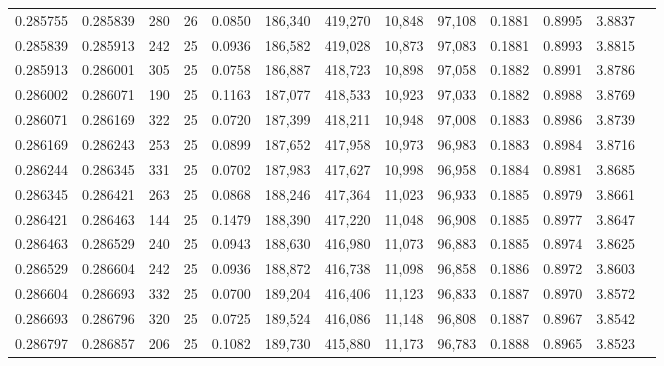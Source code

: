 \begin{tabular}{rrrrrrrrrrrrr}
0.285755 & 0.285839 &   280 &  26 &                                     0.0850 & 186,340 & 419,270 &  10,848 &  97,108 & 0.1881 & 0.8995 & 3.8837 \\
0.285839 & 0.285913 &   242 &  25 &                                     0.0936 & 186,582 & 419,028 &  10,873 &  97,083 & 0.1881 & 0.8993 & 3.8815 \\
0.285913 & 0.286001 &   305 &  25 &                                     0.0758 & 186,887 & 418,723 &  10,898 &  97,058 & 0.1882 & 0.8991 & 3.8786 \\
0.286002 & 0.286071 &   190 &  25 &                                     0.1163 & 187,077 & 418,533 &  10,923 &  97,033 & 0.1882 & 0.8988 & 3.8769 \\
0.286071 & 0.286169 &   322 &  25 &                                     0.0720 & 187,399 & 418,211 &  10,948 &  97,008 & 0.1883 & 0.8986 & 3.8739 \\
0.286169 & 0.286243 &   253 &  25 &                                     0.0899 & 187,652 & 417,958 &  10,973 &  96,983 & 0.1883 & 0.8984 & 3.8716 \\
0.286244 & 0.286345 &   331 &  25 &                                     0.0702 & 187,983 & 417,627 &  10,998 &  96,958 & 0.1884 & 0.8981 & 3.8685 \\
0.286345 & 0.286421 &   263 &  25 &                                     0.0868 & 188,246 & 417,364 &  11,023 &  96,933 & 0.1885 & 0.8979 & 3.8661 \\
0.286421 & 0.286463 &   144 &  25 &                                     0.1479 & 188,390 & 417,220 &  11,048 &  96,908 & 0.1885 & 0.8977 & 3.8647 \\
0.286463 & 0.286529 &   240 &  25 &                                     0.0943 & 188,630 & 416,980 &  11,073 &  96,883 & 0.1885 & 0.8974 & 3.8625 \\
0.286529 & 0.286604 &   242 &  25 &                                     0.0936 & 188,872 & 416,738 &  11,098 &  96,858 & 0.1886 & 0.8972 & 3.8603 \\
0.286604 & 0.286693 &   332 &  25 &                                     0.0700 & 189,204 & 416,406 &  11,123 &  96,833 & 0.1887 & 0.8970 & 3.8572 \\
0.286693 & 0.286796 &   320 &  25 &                                     0.0725 & 189,524 & 416,086 &  11,148 &  96,808 & 0.1887 & 0.8967 & 3.8542 \\
0.286797 & 0.286857 &   206 &  25 &                                     0.1082 & 189,730 & 415,880 &  11,173 &  96,783 & 0.1888 & 0.8965 & 3.8523 \\

\end{tabular}
